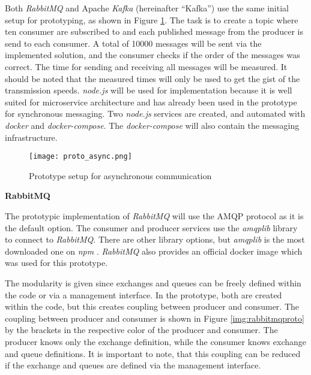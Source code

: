 
Both \textit{RabbitMQ} and Apache \textit{Kafka} (hereinafter \enquote{Kafka}) use the same initial setup for prototyping, as shown in Figure \ref{img:prototypeasynccomm}.
The task is to create a topic where ten consumer are subscribed to and each published message from the producer is send to each consumer.
A total of 10000 messages will be sent via the implemented solution, and the consumer checks if the order of the messages was correct.
The time for sending and receiving all messages will be measured.
It should be noted that the measured times will only be used to get the gist of the transmission speeds.
\textit{node.js} will be used for implementation because it is well suited for microservice architecture \cite{AnkitKumar.2019} and has already been used in the prototype for synchronous messaging.
Two \textit{node.js} services are created, and automated with \textit{docker} and \textit{docker-compose}.
The \textit{docker-compose} will also contain the messaging infrastructure.

\begin{figure}[h]
	\centering
	\texttt{[image: proto\_async.png]}
	\caption{Prototype setup for asynchronous communication}
	\label{img:prototypeasynccomm}
\end{figure}

\textbf{RabbitMQ}

The prototypic implementation of \textit{RabbitMQ} will use the \ac{AMQP} protocol as it is the default option.
The consumer and producer services use the \textit{amqplib} library to connect to \textit{RabbitMQ}.
There are other library options, but \textit{amqplib} is the most downloaded one on \textit{npm} \cite{npmtrends.2020}.
\textit{RabbitMQ} also provides an official docker image which was used for this prototype.

The modularity is given since exchanges and queues can be freely defined within the code or via a management interface.
In the prototype, both are created within the code, but this creates coupling between producer and consumer.
The coupling between producer and consumer is shown in Figure \ref{img:rabbitmqproto} by the brackets in the respective color of the producer and consumer.
The producer knows only the exchange definition, while the consumer knows exchange and queue definitions.
It is important to note, that this coupling can be reduced if the exchange and queues are defined via the management interface.

